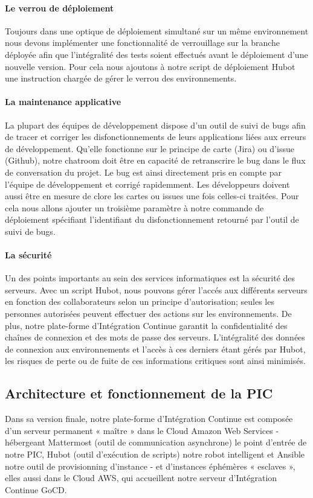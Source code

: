           \paragraph{Le verrou de déploiement} Toujours dans une optique de déploiement simultané sur un même environnement nous devons implémenter une fonctionnalité de verrouillage sur la branche déployée afin que l'intégralité des tests soient effectués avant le déploiement d'une nouvelle version. Pour cela nous ajoutons à notre script de déploiement Hubot une instruction chargée de gérer le verrou des environnements.

          \paragraph{La maintenance applicative} La plupart des équipes de développement dispose d'un outil de suivi de bugs afin de tracer et corriger les disfonctionnements de leurs applications liées aux erreurs de développement. Qu'elle fonctionne sur le principe de carte (Jira) ou d'issue (Github), notre chatroom doit être en capacité de retranscrire le bug dans le flux de conversation du projet. Le bug est ainsi directement pris en compte par l'équipe de développement et corrigé rapidemment. Les développeurs doivent aussi être en mesure de clore les cartes ou issues une fois celles-ci traitées. Pour cela nous allons ajouter un troisième paramètre à notre commande de déploiement spécifiant l'identifiant du disfonctionnement retourné par l'outil de suivi de bugs.

          \paragraph{La sécurité} Un des points importants au sein des services informatiques est la sécurité des serveurs. Avec un script Hubot, nous pouvons gérer l'accés aux différents serveurs en fonction des collaborateurs selon un principe d'autorisation; seules les personnes autorisées peuvent effectuer des actions sur les environnements. De plus, notre plate-forme d'Intégration Continue garantit la confidentialité des chaînes de connexion et des mots de passe des serveurs. L'intégralité des données de connexion aux environnements et l'accès à ces derniers étant gérés par Hubot, les risques de perte ou de fuite de ces informations critiques sont ainsi minimisés.

      \subsection{Architecture et fonctionnement de la PIC}
      Dans sa version finale, notre plate-forme d'Intégration Continue est composée d'un serveur permanent « maître » dans le Cloud Amazon Web Services - hébergeant Mattermost (outil de communication asynchrone) le point d'entrée de notre PIC, Hubot (outil d'exécution de scripts) notre robot intelligent et Ansible notre outil de provisionning d'instance - et d'instances éphémères « esclaves », elles aussi dans le Cloud AWS, qui accueillent notre serveur d'Intégration Continue GoCD.\\

